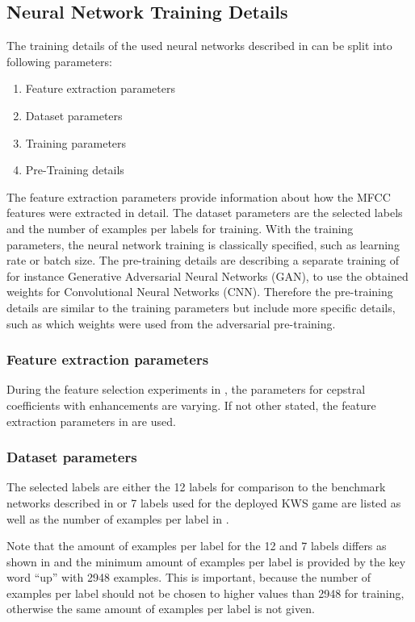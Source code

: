 
\subsection{Neural Network Training Details}\label{sec:exp_details_training}
The training details of the used neural networks described in  can be split into following parameters:
\begin{enumerate}
  \item Feature extraction parameters
  \item Dataset parameters
  \item Training parameters
  \item Pre-Training details
\end{enumerate}
The feature extraction parameters provide information about how the MFCC features were extracted in detail.
The dataset parameters are the selected labels and the number of examples per labels for training.
With the training parameters, the neural network training is classically specified, such as learning rate or batch size.
The pre-training details are describing a separate training of for instance Generative Adversarial Neural Networks (GAN), to use the obtained weights for Convolutional Neural Networks (CNN).
Therefore the pre-training details are similar to the training parameters but include more specific details, such as which weights were used from the adversarial pre-training.



\subsubsection{Feature extraction parameters}
During the feature selection experiments in , the parameters for cepstral coefficients with enhancements are varying.
If not other stated, the feature extraction parameters in  are used.




\subsubsection{Dataset parameters}
The selected labels are either the 12 labels for comparison to the benchmark networks described in  or 7 labels used for the deployed KWS game are listed as well as the number of examples per label in .

Note that the amount of examples per label for the 12 and 7 labels differs as shown in  and the minimum amount of examples per label is provided by the key word \enquote{up} with 2948 examples.
This is important, because the number of examples per label should not be chosen to higher values than 2948 for training, otherwise the same amount of examples per label is not given.


